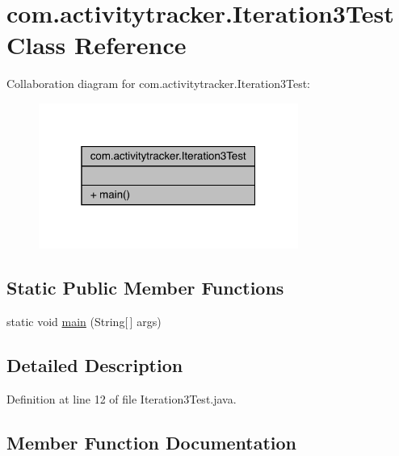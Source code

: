 \hypertarget{classcom_1_1activitytracker_1_1_iteration3_test}{}\section{com.\+activitytracker.\+Iteration3\+Test Class Reference}
\label{classcom_1_1activitytracker_1_1_iteration3_test}


Collaboration diagram for com.\+activitytracker.\+Iteration3\+Test\+:
\nopagebreak
\begin{figure}[H]
\begin{center}
\leavevmode
\includegraphics[width=241pt]{classcom_1_1activitytracker_1_1_iteration3_test__coll__graph}
\end{center}
\end{figure}
\subsection*{Static Public Member Functions}
\begin{DoxyCompactItemize}
\item 
static void \mbox{\hyperlink{classcom_1_1activitytracker_1_1_iteration3_test_a54f41d79b383667b8f79258dbfd7771c}{main}} (String\mbox{[}$\,$\mbox{]} args)
\end{DoxyCompactItemize}


\subsection{Detailed Description}


Definition at line 12 of file Iteration3\+Test.\+java.



\subsection{Member Function Documentation}
\mbox{\label{classcom_1_1activitytracker_1_1_iteration3_test_a54f41d79b383667b8f79258dbfd7771c}} 
